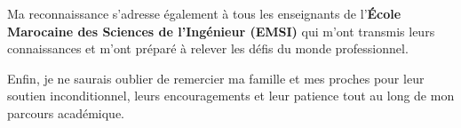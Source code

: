 \vspace{0.5cm}

Ma reconnaissance s'adresse \'egalement \`a tous les enseignants de l'\textbf{\'Ecole Marocaine des Sciences de l'Ing\'enieur (EMSI)} qui m'ont transmis leurs connaissances et m'ont pr\'epar\'e \`a relever les d\'efis du monde professionnel.

\vspace{0.5cm}

Enfin, je ne saurais oublier de remercier ma famille et mes proches pour leur soutien inconditionnel, leurs encouragements et leur patience tout au long de mon parcours acad\'emique.